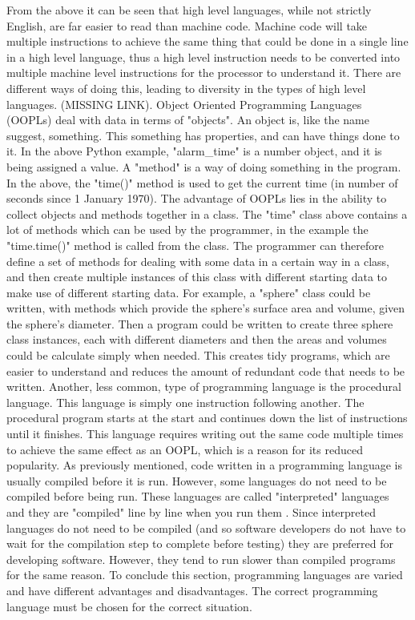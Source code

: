 \documentclass[a4]{report}
\begin{document}
	From the above it can be seen that high level languages, while not strictly English, are far easier to read than machine code. Machine code will take multiple instructions to achieve the same thing that could be done in a single line in a high level language, thus a high level instruction needs to be converted into multiple machine level instructions for the processor to understand it. There are different ways of doing this, leading to diversity in the types of high level languages. (MISSING LINK). Object Oriented Programming Languages (OOPLs) deal with data in terms of "objects"\cite{proglangwhatisoopl}. An object is, like the name suggest, something. This something has properties, and can have things done to it. In the above Python example, "alarm\_time" is a number object, and it is being assigned a value. A "method" is a way of doing something in the program. In the above, the "time()" method is used to get the current time (in number of seconds since 1 January 1970). The advantage of OOPLs lies in the ability to collect objects and methods together in a class. The "time" class above contains a lot of methods which can be used by the programmer, in the example the "time.time()" method is called from the class. The programmer can therefore define a set of methods for dealing with some data in a certain way in a class, and then create multiple instances of this class with different starting data to make use of different starting data. For example, a "sphere" class could be written, with methods which provide the sphere's surface area and volume, given the sphere's diameter. Then a program could be written to create three sphere class instances, each with different diameters and then the areas and volumes could be calculate simply when needed. This creates tidy programs, which are easier to understand and reduces the amount of redundant code that needs to be written.\newline \newline  \noindent
	Another, less common, type of programming language is the procedural language. This language is simply one instruction following another\cite{proglangwhatisoopl}. The procedural program starts at the start and continues down the list of instructions until it finishes. This language requires writing out the same code multiple times to achieve the same effect as an OOPL, which is a reason for its reduced popularity.\newline \newline  \noindent
	As previously mentioned, code written in a programming language is usually compiled before it is run. However, some languages do not need to be compiled before being run. These languages are called "interpreted" languages and they are "compiled" line by line when you run them \cite{proglanginterp}. Since interpreted languages do not need to be compiled (and so software developers do not have to wait for the compilation step to complete before testing) they are preferred for developing software. However, they tend to run slower than compiled programs for the same reason.\newline \newline  \noindent
	To conclude this section,  programming languages are varied and have different advantages and disadvantages. The correct programming language must be chosen for the correct situation.\newline \newline  \noindent
\end{document}
